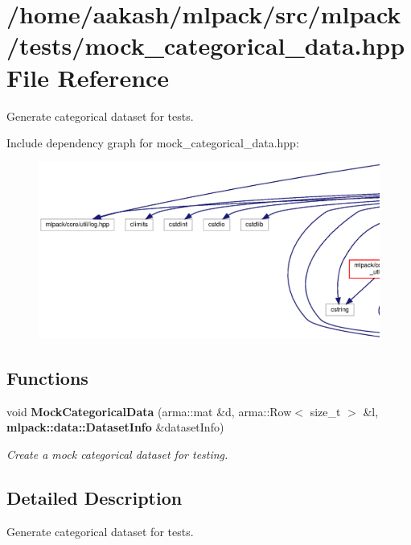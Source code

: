 \section{/home/aakash/mlpack/src/mlpack/tests/mock\+\_\+categorical\+\_\+data.hpp File Reference}
\label{mock__categorical__data_8hpp}


Generate categorical dataset for tests.  


Include dependency graph for mock\+\_\+categorical\+\_\+data.\+hpp\+:
\nopagebreak
\begin{figure}[H]
\begin{center}
\leavevmode
\includegraphics[width=350pt]{mock__categorical__data_8hpp__incl}
\end{center}
\end{figure}
\subsection*{Functions}
\begin{DoxyCompactItemize}
\item 
void \textbf{ Mock\+Categorical\+Data} (arma\+::mat \&d, arma\+::\+Row$<$ size\+\_\+t $>$ \&l, \textbf{ mlpack\+::data\+::\+Dataset\+Info} \&dataset\+Info)
\begin{DoxyCompactList}\small\item\em Create a mock categorical dataset for testing. \end{DoxyCompactList}\end{DoxyCompactItemize}


\subsection{Detailed Description}
Generate categorical dataset for tests. 

